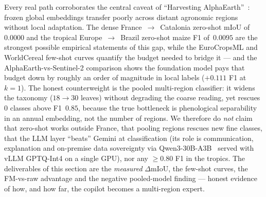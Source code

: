 Every real path corroborates the central caveat of ``Harvesting
AlphaEarth''~\cite{harvesting2026alphaearth}: frozen global embeddings transfer poorly
across distant agronomic regions without local adaptation. The dense
France~$\rightarrow$~Catalonia zero-shot mIoU of~$0.0000$ and the tropical
Europe~$\rightarrow$~Brazil zero-shot maize F1 of~$0.0095$ are the strongest possible
empirical statements of this gap, while the EuroCropsML and WorldCereal few-shot curves
quantify the budget needed to bridge it --- and the AlphaEarth-vs-Sentinel-2 comparison
shows the foundation model pays that budget down by roughly an order of magnitude in local
labels ($+0.111$ F1 at $k{=}1$). The honest counterweight is the pooled multi-region
classifier: it widens the taxonomy ($18\rightarrow30$ leaves) without degrading the coarse
reading, yet rescues $0$ classes above F1~$0.85$, because the true bottleneck is
phenological separability in an annual embedding, not the number of regions. We therefore do
\emph{not} claim that zero-shot works outside France, that pooling regions rescues new fine
classes, that the LLM layer ``beats'' Gemini at classification (its role is communication,
explanation and on-premise data sovereignty via Qwen3-30B-A3B~\cite{yang2025qwen3} served
with vLLM GPTQ-Int4 on a single GPU), nor any $\geq$0.80 F1 in the tropics. The
deliverables of this section are the \emph{measured} $\Delta$mIoU, the few-shot curves, the
FM-vs-raw advantage and the negative pooled-model finding --- honest evidence of how, and how
far, the copilot becomes a multi-region expert.

